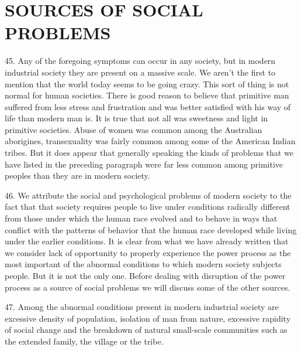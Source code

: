 \documentclass{article}
\begin{document}
\section{SOURCES OF SOCIAL PROBLEMS}

\hspace{0.5cm} 45. Any of the foregoing symptoms can occur in any society, but in modern industrial society they 
are present on a massive scale. We aren’t the first to mention that the world today seems to be 
going crazy. This sort of thing is not normal for human societies. There is good reason to believe 
that primitive man suffered from less stress and frustration and was better satisfied with his way 
of life than modern man is. It is true that not all was sweetness and light in primitive 
societies. Abuse of women was common among the Australian aborigines, transexuality was fairly 
common among some of the American Indian tribes. But it does appear that generally speaking 
the kinds of problems that we have listed in the preceding paragraph were far less common among 
primitive peoples than they are in modern society. \vspace{\baselineskip}

46. We attribute the social and psychological problems of modern society to the fact that that 
society requires people to live under conditions radically different from those under which the 
human race evolved and to behave in ways that conflict with the patterns of behavior that the 
human race developed while living under the earlier conditions. It is clear from what we have 
already written that we consider lack of opportunity to properly experience the power process as 
the most important of the abnormal conditions to which modern society subjects people. But it is 
not the only one. Before dealing with disruption of the power process as a source of social 
problems we will discuss some of the other sources. \vspace{\baselineskip}

47. Among the abnormal conditions present in modern industrial society are excessive density of 
population, isolation of man from nature, excessive rapidity of social change and the breakdown 
of natural small-scale communities such as the extended family, the village or the tribe. \vspace{\baselineskip}
\end{document}
